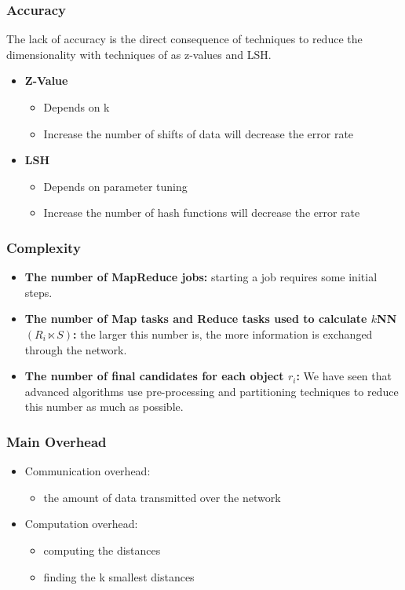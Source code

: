 \begin{frame}
\frametitle{Accuracy}
The lack of accuracy is the direct consequence of techniques to reduce the dimensionality with techniques of as z-values and LSH.
\begin{itemize}
\item \textbf{Z-Value}
\begin{itemize}
\item Depends on k
\item Increase the number of shifts of data will decrease the error rate
\end{itemize}
\item \textbf{LSH}
\begin{itemize}
\item Depends on parameter tuning
\item Increase the number of hash functions will decrease the error rate
\end{itemize}
\end{itemize}
\end{frame}


\begin{frame}
\frametitle{Complexity}

\begin{itemize}
\item \textbf{The number of MapReduce jobs: } starting a job requires some initial steps.

\item \textbf{The number of Map tasks and Reduce tasks used to calculate $k$NN$\left(R_i \ltimes S\right)$: } the larger this number is, the more information is exchanged through the network.

\item \textbf{The number of final candidates for each object $r_i$: } 
We have seen that advanced algorithms use pre-processing and partitioning techniques to reduce this number as much as possible. 

\end{itemize}
\end{frame}

\begin{frame}
\frametitle{Main Overhead }
\begin{itemize}
\item Communication overhead:
\begin{itemize}
\item the amount of data transmitted over the network
\end{itemize}
\item Computation overhead:
\begin{itemize}
\item computing the distances
\item finding the k smallest distances
\end{itemize}
\end{itemize}
\end{frame}

